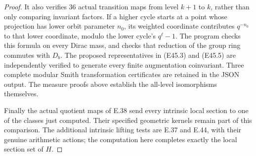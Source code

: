 \begin{proof}
It also verifies $36$ actual
transition maps from level
$k+1$ to $k$, rather than
only comparing invariant
factors. If a higher cycle
starts at a point whose
projection has lower orbit
parameter $n_0$, its weighted
coordinate contributes
$q^{-n_0}$ to that lower
coordinate, modulo the lower
cycle's $q^\ell-1$.
The program checks this
formula on every Dirac
mass, and checks that
reduction of the group
ring commutes with $D_b$.
The proposed representatives
in (E45.3) and (E45.5)
are independently verified
to generate every finite
augmentation coinvariant.
Three complete modular
Smith transformation
certificates are retained
in the JSON output.
The measure proofs above
establish the all-level
isomorphisms themselves.

Finally the actual quotient
maps of E.38 send every
intrinsic local section to
one of the classes just
computed. Their specified
geometric kernels remain
part of this comparison.
The additional intrinsic
lifting tests are E.37
and E.44, with their
genuine arithmetic actions;
the computation here
completes exactly the
local section set of $H$.
\end{proof}
